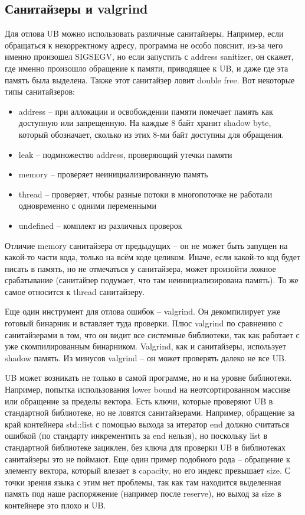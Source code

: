 \documentclass[12pt, a4paper]{article}
\begin{document}
	\subsection{Санитайзеры и valgrind}
	Для отлова UB можно использовать различные санитайзеры. Например, если обращаться к некорректному адресу, программа не особо пояснит, из-за чего именно произошел SIGSEGV, но если запустить с address sanitizer, он скажет, где именно произошло обращение к памяти, приводящее к UB, и даже где эта память была выделена. Также этот санитайзер ловит double free. Вот некоторые типы санитайзеров:
	\begin{itemize}
		\item address -- при аллокации и освобождении памяти помечает память как доступную или запрещенную. На каждые 8 байт хранит shadow byte, который обозначает, сколько из этих 8-ми байт доступны для обращения.
		\item leak -- подмножество address, проверяющий утечки памяти
		\item memory -- проверяет неинициализированную память
		\item thread -- проверяет, чтобы разные потоки в многопоточке не работали одновременно с одними переменными
		\item undefined -- комплект из различных проверок
	\end{itemize}
	Отличие memory санитайзера от предыдущих -- он не может быть запущен на какой-то части кода, только на всём коде целиком. Иначе, если какой-то код будет писать в память, но не отмечаться у санитайзера, может произойти ложное срабатывание (санитайзер подумает, что там неинициализирована память). То же самое относится к thread санитайзеру.
	\\\par Еще один инструмент для отлова ошибок -- valgrind. Он декомпилирует уже готовый бинарник и вставляет туда проверки. Плюс valgrind по сравнению с санитайзерами в том, что он видит все системные библиотеки, так как работает с уже скомпилированным бинарником. Valgrind, как и санитайзеры, использует shadow память. Из минусов valgrind -- он может проверять далеко не все UB.
	\\\par UB может возникать не только в самой программе, но и на уровне библиотеки. Например, попытка использования lower bound на неотсортированном массиве или обращение за пределы вектора. Есть ключи, которые проверяют UB в стандартной библиотеке, но не ловятся санитайзерами. Например, обращение за край контейнера std::list с помощью выхода за итератор end должно считаться ошибкой (по стандарту инкрементить за end нельзя), но поскольку list в стандартной библиотеке зациклен, без ключа для проверки UB в библиотеках санитайзеры это не поймают. Еще один пример подобного рода -- обращение к элементу вектора, который влезает в capacity, но его индекс превышает size. С точки зрения языка с этим нет проблемы, так как там находится выделенная память под наше распоряжение (например после reserve), но выход за size в контейнере это плохо и UB.
\end{document}
